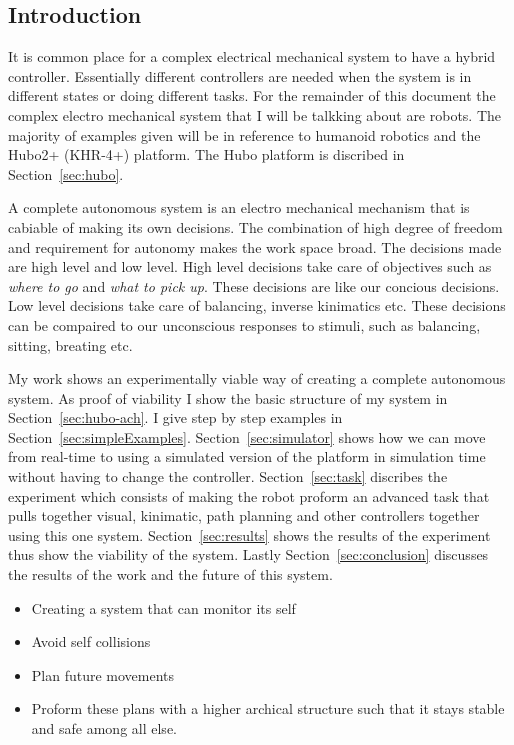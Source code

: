 \subsection{Introduction}



It is common place for a complex electrical mechanical system to have a hybrid controller.  
Essentially different controllers are needed when the system is in different states or doing different tasks.
For the remainder of this document the complex electro mechanical system that I will be talkking about are robots.
The majority of examples given will be in reference to humanoid robotics and the Hubo2+ (KHR-4+) platform.
The Hubo platform is discribed in Section~\ref{sec:hubo}.

A complete autonomous system is an electro mechanical mechanism that is cabiable of making its own decisions.
The combination of high degree of freedom and requirement for autonomy makes the work space broad.
The decisions made are high level and low level.
High level decisions take care of objectives such as \textit{where to go} and \textit{what to pick up}. 
These decisions are like our concious decisions.
Low level decisions take care of balancing, inverse kinimatics etc.
These decisions can be compaired to our unconscious responses to stimuli, such as balancing, sitting, breating etc.

My work shows an experimentally viable way of creating a complete autonomous system.  
As proof of viability I show the basic structure of my system in Section~\ref{sec:hubo-ach}.  
I give step by step examples in Section~\ref{sec:simpleExamples}.
Section~\ref{sec:simulator} shows how we can move from real-time to using a simulated version of the platform in simulation time without having to change the controller.
Section~\ref{sec:task} discribes the experiment which consists of making the robot proform an advanced task that pulls together visual, kinimatic, path planning and other controllers together using this one system.
Section~\ref{sec:results} shows the results of the experiment thus show the viability of the system.
Lastly Section~\ref{sec:conclusion} discusses the results of the work and the future of this system.






\begin{itemize}
\item Creating a system that can monitor its self
\item Avoid self collisions
\item Plan future movements
\item Proform these plans with a higher archical structure such that it stays stable and safe among all else.
\end{itemize}
